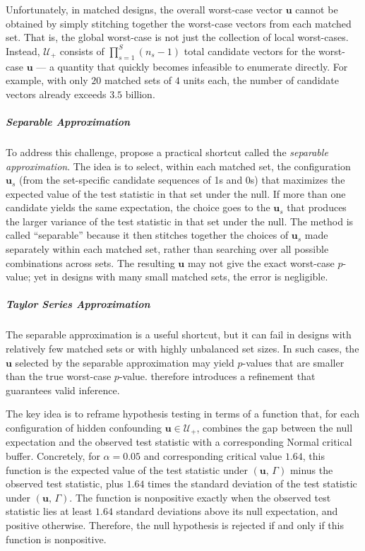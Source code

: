 \documentclass[
  12pt,
  leqno]{article}
\begin{document}
Unfortunately, in matched designs, the overall worst-case vector
\(\bm{u}\) cannot be obtained by simply stitching together the
worst-case vectors from each matched set. That is, the global worst-case
is not just the collection of local worst-cases. Instead,
\(\mathcal{U}_{+}\) consists of \(\prod_{s = 1}^S (n_s - 1)\) total
candidate vectors for the worst-case \(\bm{u}\) --- a quantity that
quickly becomes infeasible to enumerate directly. For example, with only
\(20\) matched sets of \(4\) units each, the number of candidate vectors
already exceeds \(3.5\) billion.

\subparagraph{Separable Approximation}\label{separable-approximation}

To address this challenge, \citet{gastwirthetal2000} propose a practical
shortcut called the \emph{separable approximation}. The idea is to
select, within each matched set, the configuration \(\bm{u}_s\) (from
the set-specific candidate sequences of 1s and 0s) that maximizes the
expected value of the test statistic in that set under the null. If more
than one candidate yields the same expectation, the choice goes to the
\(\bm{u}_s\) that produces the larger variance of the test statistic in
that set under the null. The method is called ``separable'' because it
then stitches together the choices of \(\bm{u}_s\) made separately
within each matched set, rather than searching over all possible
combinations across sets. The resulting \(\bm{u}\) may not give the
exact worst-case \(p\)-value; yet in designs with many small matched
sets, the error is negligible.

\subparagraph{Taylor Series
Approximation}\label{taylor-series-approximation}

The separable approximation is a useful shortcut, but it can fail in
designs with relatively few matched sets or with highly unbalanced set
sizes. In such cases, the \(\bm{u}\) selected by the separable
approximation may yield \(p\)-values that are smaller than the true
worst-case \(p\)-value. \citet{rosenbaum2018} therefore introduces a
refinement that guarantees valid inference.

The key idea is to reframe hypothesis testing in terms of a function
that, for each configuration of hidden confounding
\(\bm{u} \in \mathcal{U}_{+}\), combines the gap between the null
expectation and the observed test statistic with a corresponding Normal
critical buffer. Concretely, for \(\alpha = 0.05\) and corresponding
critical value \(1.64\), this function is the expected value of the test
statistic under \((\bm{u}, \, \Gamma)\) minus the observed test
statistic, plus \(1.64\) times the standard deviation of the test
statistic under \((\bm{u}, \, \Gamma)\). The function is nonpositive
exactly when the observed test statistic lies at least \(1.64\) standard
deviations above its null expectation, and positive otherwise.
Therefore, the null hypothesis is rejected if and only if this function
is nonpositive.
\end{document}
